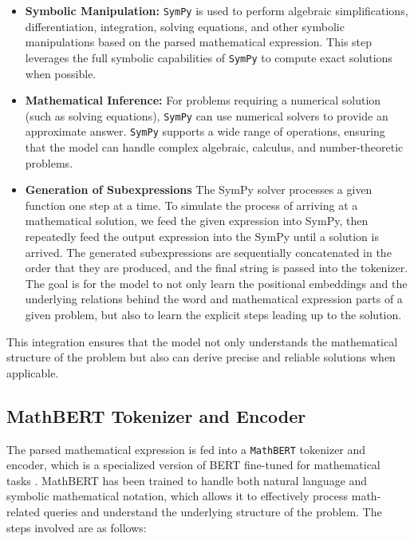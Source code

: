 \documentclass{article}
\begin{document}
\begin{itemize}
    \item \textbf{Symbolic Manipulation:} \texttt{SymPy} is used to perform algebraic simplifications, differentiation, integration, solving equations, and other symbolic manipulations based on the parsed mathematical expression. This step leverages the full symbolic capabilities of \texttt{SymPy} to compute exact solutions when possible.
    \item \textbf{Mathematical Inference:} For problems requiring a numerical solution (such as solving equations), \texttt{SymPy} can use numerical solvers to provide an approximate answer. \texttt{SymPy} supports a wide range of operations, ensuring that the model can handle complex algebraic, calculus, and number-theoretic problems.
    \item \textbf{Generation of Subexpressions} The SymPy solver processes a given function one step at a time. To simulate the process of arriving at a mathematical solution, we feed the given expression into SymPy, then repeatedly feed the output expression into the SymPy until a solution is arrived. The generated subexpressions are sequentially concatenated in the order that they are produced, and the final string is passed into the tokenizer. The goal is for the model to not only learn the positional embeddings and the underlying relations behind the word and mathematical expression parts of a given problem, but also to learn the explicit steps leading up to the solution. 
\end{itemize}

This integration ensures that the model not only understands the mathematical structure of the problem but also can derive precise and reliable solutions when applicable.

\subsection{MathBERT Tokenizer and Encoder}

The parsed mathematical expression is fed into a \texttt{MathBERT} tokenizer and encoder, which is a specialized version of BERT fine-tuned for mathematical tasks \cite{mathBERT}. MathBERT has been trained to handle both natural language and symbolic mathematical notation, which allows it to effectively process math-related queries and understand the underlying structure of the problem. The steps involved are as follows:
\end{document}
